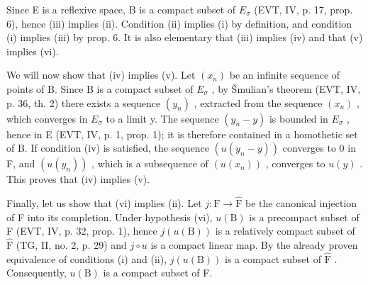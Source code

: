 Since E is a reflexive space, B is a compact subset of \(E_{\sigma}\) (EVT, IV, p. 17, prop. 6), hence (iii) implies (ii). Condition (ii) implies (i) by definition, and condition (i) implies (iii) by prop. 6. It is also elementary that (iii) implies (iv) and that (v) implies (vi).

We will now show that (iv) implies (v). Let \((x_{n})\) be an infinite sequence of points of B. Since B is a compact subset of \(E_{\sigma}\) , by Šmulian's theorem (EVT, IV, p. 36, th. 2) there exists a sequence \((y_{n})\) , extracted from the sequence \((x_{n})\) , which converges in \(E_{\sigma}\) to a limit y. The sequence \((y_{n}-y)\) is bounded in \(E_{\sigma}\) , hence in E (EVT, IV, p. 1, prop. 1); it is therefore contained in a homothetic set of B. If condition (iv) is satisfied, the sequence \((u(y_{n}-y))\) converges to 0 in F, and \((u(y_{n}))\) , which is a subsequence of \((u(x_{n}))\) , converges to \(u(y)\) . This proves that (iv) implies (v).

Finally, let us show that (vi) implies (ii). Let \(j: \mathrm{F} \to \widehat{\mathrm{F}}\) be the canonical injection of F into its completion. Under hypothesis (vi), \(u(\mathrm{B})\) is a precompact subset of F (EVT, IV, p. 32, prop. 1), hence \(j(u(\mathrm{B}))\) is a relatively compact subset of \(\widehat{\mathrm{F}}\) (TG, II, no. 2, p. 29) and \(j \circ u\) is a compact linear map. By the already proven equivalence of conditions (i) and (ii), \(j(u(\mathrm{B}))\) is a compact subset of \(\widehat{\mathrm{F}}\) . Consequently, \(u(\mathrm{B})\) is a compact subset of F.

